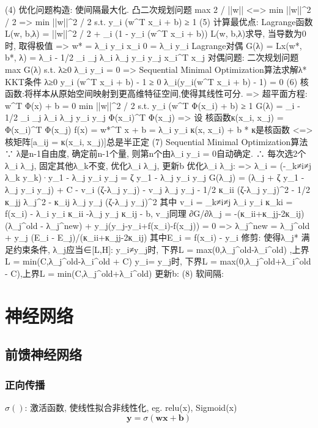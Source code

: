 \documentclass{article}
\begin{document}
			(4) 优化问题构造: 使间隔最大化. 凸二次规划问题
					max  2 / ||w||    <=>    min  ||w||^2 / 2
				=>	min		||w||^2 / 2
					s.t.	y_i (\boldsymbol w^T \boldsymbol x_i + b) ≥ 1
			(5) 计算最优点:
				Lagrange函数
					L(w, b,λ) = ||w||^2 / 2 + _i (1 - y_i (\boldsymbol w^T \boldsymbol x_i + b))
					L(w, b,λ)求导, 当导数为0时, 取得极值
					=>	w* = \sum λ_i y_i x_i		0 = \sum λ_i y_i
				Lagrange对偶
					G(λ) = Lx(w*, b*, λ) = \sum λ_i - 1/2 \sum_i \sum_j λ_i λ_j y_i y_j x_i^T x_j
				对偶问题: 二次规划问题
					max		G(λ)
					s.t.	λ≥0		\sum λ_i y_i = 0
					=>	Sequential Minimal Optimization算法求解λ*
				KKT条件
					λ≥0    y_i (\boldsymbol w^T \boldsymbol x_i + b) - 1 ≥ 0    λ_i(y_i(\boldsymbol w^T \boldsymbol x_i + b) - 1) = 0
			(6) 核函数:将样本从原始空间映射到更高维特征空间,使得其线性可分.
				=>	超平面方程: w^T Φ(x) + b = 0
					min		||w||^2 / 2
					s.t.	y_i (w^T Φ(x_i) + b) ≥ 1
					G(λ) = _i - 1/2 \sum_i \sum_j λ_i λ_j y_i y_j Φ(x_i)^T Φ(x_j)
				=>	设 核函数к(x_i, x_j) = Φ(x_i)^T Φ(x_j)
					f(x) = w*^T x + b = \sum λ_i y_i к(x, x_i) + b
				*	к是核函数 <=> 核矩阵[a_ij = к(x_i, x_j)]总是半正定
			(7) Sequential Minimal Optimization算法
				∵	λ是n-1自由度, 确定前n-1个量, 则第n个由\sum λ_i y_i = 0自动确定.
				∴	每次选2个λ_i λ_j, 固定其他λ_k不变, 优化λ_i λ_j, 更新b
				优化λ_i λ_j:
				=>	λ_i = (-\sum_{k≠i≠j} λ_k y_k)·y_1 - λ_j y_i y_j = ζ y_1 - λ_j y_i y_j
					G(λ_j) = (λ_j + ζ y_1 - λ_j y_i y_j) + C - v_i (ζ-λ_j y_j) - v_j λ_j y_j
							- 1/2 к_ii (ζ-λ_j y_j)^2 - 1/2 к_jj λ_j^2 - к_ij λ_j y_j (ζ-λ_j y_j)^2
					其中 v_i = \sum_{k≠i≠j} λ_i y_i к_ki = f(x_i) - λ_i y_i к_ii -λ_j y_j к_ij - b, v_j同理
					∂G/∂λ_j = -(к_ii+к_jj-2к_ij)(λ_j^old - λ_j^new) + y_j(y_j-y_i+f(x_i)-f(x_j)) = 0
				=>	λ_j^new = λ_j^old + y_j (E_i - E_j)/(к_ii+к_jj-2к_ij)		其中E_i = f(x_i) - y_i
				修剪: 使得λ_j* 满足约束条件, λ_j应当∈[L,H]:
					y_i≠y_j时,	下界L = max(0,λ_j^old-λ_i^old)	,上界L = min(C,λ_j^old-λ_i^old + C)
					y_i= y_j时,	下界L = max(0,λ_j^old+λ_i^old - C),上界L = min(C,λ_j^old+λ_i^old)
				更新b:
			(8)	软间隔:

\section{神经网络}
    \subsection{前馈神经网络}
        \subsubsection{正向传播}
            $\sigma()$: 激活函数, 使线性拟合非线性化, eg. relu(x), Sigmoid(x)
            $$\boldsymbol y = \sigma (\boldsymbol w \boldsymbol x + \boldsymbol b)$$
\end{document}
